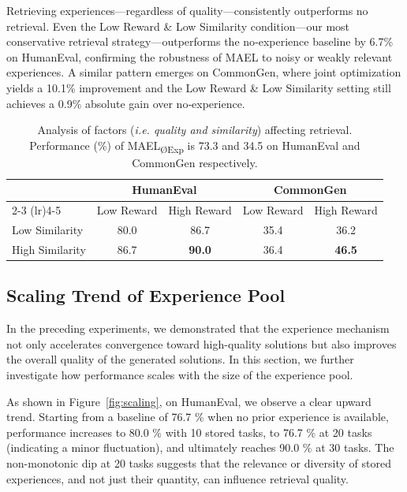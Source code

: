 \documentclass[preprint]{article}
\begin{document}
Retrieving experiences—regardless of quality—consistently outperforms no retrieval. Even the Low Reward \& Low Similarity condition—our most conservative retrieval strategy—outperforms the no‑experience baseline by 6.7\% on HumanEval, confirming the robustness of MAEL to noisy or weakly relevant experiences. A similar pattern emerges on CommonGen, where joint optimization yields a 10.1\% improvement and the Low Reward \& Low Similarity setting still achieves a 0.9\% absolute gain over no‑experience.

\begin{table}[ht]
  \centering
  \caption{Analysis of factors (\textit{i.e. quality and similarity}) affecting retrieval. Performance (\%) of MAEL\textsubscript{ØExp} is 73.3 and 34.5 on HumanEval and CommonGen respectively.}
{ 

  \begin{tabular}{lcc|cc}
    \toprule
      & \multicolumn{2}{c}{HumanEval} 
      & \multicolumn{2}{c}{CommonGen} \\
    \cmidrule(lr){2-3} \cmidrule(lr){4-5}
      & Low Reward & High Reward 
      & Low Reward & High Reward \\
    \midrule
    Low Similarity  
      & 80.0 & 86.7 
      & 35.4 & 36.2 \\
    High Similarity 
      & 86.7 & \textbf{90.0} 
      & 36.4 & \textbf{46.5} \\
    \bottomrule
  \end{tabular}
} 

  \label{tab:factor}
\end{table}

\subsection{Scaling Trend of Experience Pool}
In the preceding experiments, we demonstrated that the experience mechanism not only accelerates convergence toward high-quality solutions but also improves the overall quality of the generated solutions. In this section, we further investigate how performance scales with the size of the experience pool. 

As shown in Figure~\ref{fig:scaling}, on HumanEval, we observe a clear upward trend. Starting from a baseline of 76.7 \% when no prior experience is available, performance increases to 80.0 \% with 10 stored tasks, to 76.7 \% at 20 tasks (indicating a minor fluctuation), and ultimately reaches 90.0 \% at 30 tasks. The non-monotonic dip at 20 tasks suggests that the relevance or diversity of stored experiences, and not just their quantity, can influence retrieval quality.
\end{document}
